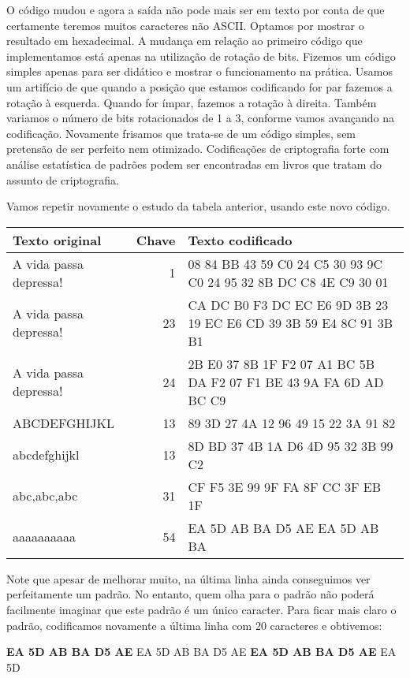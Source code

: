 O código mudou e agora a saída não pode mais ser em texto por conta de que certamente teremos muitos caracteres não ASCII. Optamos por mostrar o resultado em hexadecimal. A mudança em relação ao primeiro código que implementamos está apenas na utilização de rotação de bits. Fizemos um código simples apenas para ser didático e mostrar o funcionamento na prática. Usamos um artifício de que quando a posição que estamos codificando for par fazemos a rotação à esquerda. Quando for ímpar, fazemos a rotação à direita. Também variamos o número de bits rotacionados de 1 a 3, conforme vamos avançando na codificação. Novamente frisamos que trata-se de um código simples, sem pretensão de ser perfeito nem otimizado. Codificações de criptografia forte com análise estatística de padrões podem ser encontradas em livros que tratam do assunto de criptografia.

Vamos repetir novamente o estudo da tabela anterior, usando este novo código.

\begin{tabular}{|l|r|p{8cm}|}
\hline
Texto original&Chave&Texto codificado\\
\hline
A vida passa depressa!&1&08 84 BB 43 59 C0 24 C5 30 93 9C C0 24 95 32 8B DC C8 4E C9 30 01\\
\hline
A vida passa depressa!&23&CA DC B0 F3 DC EC E6 9D 3B 23 19 EC E6 CD 39 3B 59 E4 8C 91 3B B1\\
\hline
A vida passa depressa!&24&2B E0 37 8B 1F F2 07 A1 BC 5B DA F2 07 F1 BE 43 9A FA 6D AD BC C9\\
\hline
ABCDEFGHIJKL&13&89 3D 27 4A 12 96 49 15 22 3A 91 82\\
\hline
abcdefghijkl&13&8D BD 37 4B 1A D6 4D 95 32 3B 99 C2\\
\hline
abc,abc,abc&31&CF F5 3E 99 9F FA 8F CC 3F EB 1F\\
\hline
aaaaaaaaaa&54&EA 5D AB BA D5 AE EA 5D AB BA\\
\hline
\end{tabular}

Note que apesar de melhorar muito, na última linha ainda conseguimos ver perfeitamente um padrão. No entanto, quem olha para o padrão não poderá facilmente imaginar que este padrão é um único caracter. Para ficar mais claro o padrão, codificamos novamente a última linha com 20 caracteres e obtivemos:
\begin{center}
\textbf{EA 5D AB BA D5 AE} EA 5D AB BA D5 AE \textbf{EA 5D AB BA D5 AE} EA 5D\\
\end{center}

